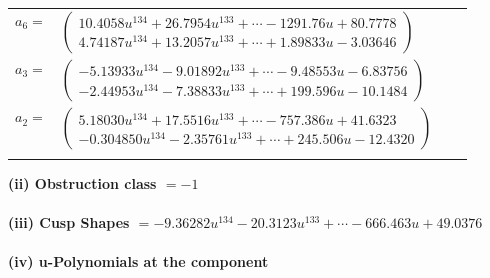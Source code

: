 \documentclass[1p]{elsarticle_modified}
\theoremstyle{definition}
\begin{document}
\begin{tabular}{m{7pt} m{180pt} m{7pt} m{180pt} }
\flushright $a_{6}=$&$\begin{pmatrix}10.4058 u^{134}+26.7954 u^{133}+\cdots-1291.76 u+80.7778\\4.74187 u^{134}+13.2057 u^{133}+\cdots+1.89833 u-3.03646\end{pmatrix}$ \\
\flushright $a_{3}=$&$\begin{pmatrix}-5.13933 u^{134}-9.01892 u^{133}+\cdots-9.48553 u-6.83756\\-2.44953 u^{134}-7.38833 u^{133}+\cdots+199.596 u-10.1484\end{pmatrix}$ \\
\flushright $a_{2}=$&$\begin{pmatrix}5.18030 u^{134}+17.5516 u^{133}+\cdots-757.386 u+41.6323\\-0.304850 u^{134}-2.35761 u^{133}+\cdots+245.506 u-12.4320\end{pmatrix}$\\&\end{tabular}
\flushleft \textbf{(ii) Obstruction class $= -1$}\\~\\
\flushleft \textbf{(iii) Cusp Shapes $= -9.36282 u^{134}-20.3123 u^{133}+\cdots-666.463 u+49.0376$}\\~\\
\newpage\renewcommand{\arraystretch}{1}
\flushleft \textbf{(iv) u-Polynomials at the component}\newline \\
\end{document}
